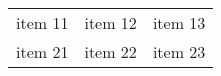 \documentclass{article}
\begin{document}
\begin{tabular}{ccc}
 item 11 & item 12 & item 13 \\
 item 21 & item 22 & item 23 
\end{tabular}
\end{document}
